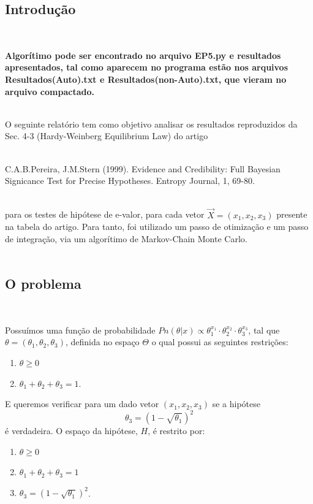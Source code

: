 \documentclass[pt12]{article}
\begin{document}
\tableofcontents

\newpage

\begin{center}\section{Introdução}\end{center}
\

\textbf{Algorítimo pode ser encontrado no arquivo EP5.py e resultados apresentados, tal como aparecem no programa estão nos arquivos Resultados(Auto).txt e Resultados(non-Auto).txt, que vieram no arquivo compactado.}\\
\ 

O seguinte relatório tem como objetivo analisar os resultados reproduzidos da Sec. 4-3 (Hardy-Weinberg Equilibrium Law) do artigo\\
\ 

C.A.B.Pereira, J.M.Stern (1999). Evidence and Credibility: Full Bayesian
Signicance Test for Precise Hypotheses. Entropy Journal, 1, 69-80.\\
\ 

para os testes de hipótese de e-valor, para cada vetor $\vec{X} = (x_1,x_2,x_3)$ presente na tabela do artigo. Para tanto, foi utilizado um passo de otimização e um passo de integração, via um algorítimo de Markov-Chain Monte Carlo.\\
\ 

\subsection{O problema}
\ 

Possuímos uma função de probabilidade $\displaystyle{Pn(\theta|x) \propto \theta_1^{x_1}\cdot\theta_2^{x_2}\cdot\theta_3^{x_3}}$, tal que $\theta = (\theta_1, \theta_2, \theta_3)$, definida no espaço $\Theta$ o qual possui as seguintes restrições:

\begin{enumerate}
\item $\theta \geq 0$
\item $\theta_1+\theta_2+\theta_3 = 1$.
\end{enumerate}

E queremos verificar para um dado vetor $(x_1,x_2,x_3)$ se a hipótese
$$\displaystyle{\theta_3 = (1 - \sqrt{\theta_1})^2}$$
é verdadeira. O espaço da hipótese, $H$, é restrito por:

\begin{enumerate}
\item $\theta \geq 0$
\item $\theta_1+\theta_2+\theta_3 = 1$
\item $\displaystyle{\theta_3 = (1 - \sqrt{\theta_1})^2}$.
\end{enumerate}
\end{document}
